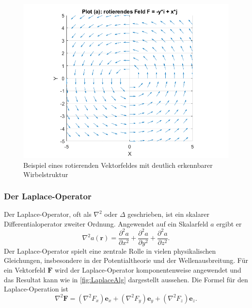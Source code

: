 \begin{figure}
    \centering
    \includegraphics[scale=0.4]{papers/helmholtz/images/rotierendes_Feld.png}
    \caption{Beispiel eines rotierenden Vektorfeldes mit deutlich erkennbarer Wirbelstruktur}
    \label{fig:RotationAlg}
\end{figure}

\subsubsection{Der Laplace-Operator}

Der Laplace-Operator, oft als $\nabla^2$ oder $\Delta$ geschrieben, ist ein skalarer Differentialoperator zweiter Ordnung. Angewendet auf ein Skalarfeld $a$ ergibt er
\begin{equation}
\nabla^2 a(\boldsymbol{r}) = \frac{\partial^2 a}{\partial x^2} + \frac{\partial^2 a}{\partial y^2} + \frac{\partial^2 a}{\partial z^2}.
\end{equation}
Der Laplace-Operator spielt eine zentrale Rolle in vielen physikalischen Gleichungen, insbesondere in der Potentialtheorie und der Wellenausbreitung. Für ein Vektorfeld $\boldsymbol{F}$ wird der Laplace-Operator komponentenweise angewendet und das Resultat kann wie in \ref{fig:LaplaceAlg} dargestellt aussehen. Die Formel für den Laplace-Operation ist
\begin{equation}
\nabla^2 \boldsymbol{F} = (\nabla^2 F_x)\boldsymbol{e}_x + (\nabla^2 F_y)\boldsymbol{e}_y + (\nabla^2 F_z)\boldsymbol{e}_z.
\end{equation}

